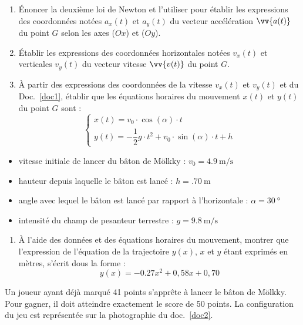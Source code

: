 \documentclass[a4paper,11pt,fleqn]{article}%
\begin{document}
\begin{enumerate}
    \item Énoncer la deuxième loi de Newton et l'utiliser pour établir les expressions des coordonnées notées $a_x(t)$ et $a_y(t)$ du vecteur accélération $\vv{a(t)}$ du point $G$ selon les axes ($Ox$) et ($Oy$).
    \item Établir les expressions des coordonnées horizontales notées $v_x(t)$ et verticales $v_y(t)$ du vecteur vitesse $\vv{v(t)}$ du point $G$.
    \item À partir des expressions des coordonnées de la vitesse $v_x(t)$ et $v_y(t)$ et du Doc.~\ref{doc1}, établir que les équations horaires du mouvement $x(t)$ et $y(t)$ du point $G$ sont : 
    \[
        \left\{
        \begin{array}{l}
        x(t) = v_0 \cdot \cos(\alpha) \cdot t \\[4pt]
        y(t) = - \dfrac{1}{2} g \cdot t^2 + v_0 \cdot \sin(\alpha)\cdot t + h
        \end{array}
        \right.
    \]
\end{enumerate}

\begin{data}
    \begin{itemize}
        \item vitesse initiale de lancer du bâton de Mölkky : $v_0 = \SI{4,9}{\meter\per\second}$
        \item hauteur depuis laquelle le bâton est lancé : $h = \SI{.70}{\meter}$
        \item angle avec lequel le bâton est lancé par rapport à l'horizontale : $\alpha = \SI{30}{\degree}$
        \item intensité du champ de pesanteur terrestre : $g = \SI{9.8}{\meter\per\second}$
    \end{itemize}
\end{data}

\begin{enumerate}[resume]
    \item À l'aide des données et des équations horaires du mouvement, montrer que l'expression de l'équation de la trajectoire $y(x)$, $x$ et $y$ étant exprimés en mètres, s'écrit dous la forme : $$y(x) = -0.27 x^2 + 0,58 x + 0,70$$
\end{enumerate}
Un joueur ayant déjà marqué 41 points s'apprête à lancer le bâton de Mölkky. Pour gagner, il doit atteindre exactement le score de 50 points. La configuration du jeu est représentée sur la photographie du doc.~\ref{doc2}.
\end{document}
